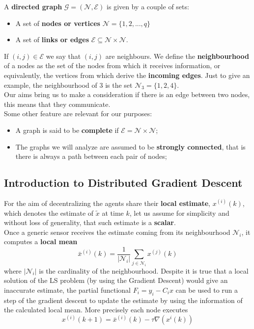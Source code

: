 \noindent
A \textbf{directed graph} $\mathcal{G}=(\mathcal{N}, \mathcal{E})$ is given by a couple of sets:
\begin{itemize}
    \item A set of \textbf{nodes or vertices} $\mathcal{N}=\{1,2,..., q\}$
    \item A set of \textbf{links or edges} $\mathcal{E}\subseteq\mathcal{N} \times  \mathcal{N}.$
\end{itemize}
If $(i,j)\in\mathcal{E}$ we say that $(i,j)$ are neighbours. We define the \textbf{neighbourhood} of a nodes as the set of the nodes from which it receives information, or equivalently, the vertices from which derive the \textbf{incoming edges}. Just to give an example, the neighbourhood of 3 is the set $\mathcal{N}_3=\{1,2,4\}$. \\
Our aims bring us to make a consideration if there is an edge between two nodes, this means that they communicate.\\
Some other feature are relevant for our purposes: 
\begin{itemize}
    \item A graph is said to be \textbf{complete} if $\mathcal{E}=\mathcal{N} \times \mathcal{N}$; 
    \item The graphs we will analyze are assumed to be \textbf{strongly connected}, that is there is always a path between each pair of nodes; 
\end{itemize}

\subsection{Introduction to Distributed Gradient Descent}
For the aim of decentralizing the agents share their \textbf{local estimate}, $x^{(i)}(k)$, which denotes the {\color{red} estimate of $\tilde{x}$ at time $k$}, let us assume for simplicity and without loss of generality, that such estimate is a \textbf{scalar}. \\
Once a generic sensor receives the estimate coming from its neighbourhood $\mathcal{N}_i$, it computes a \textbf{local mean}
\begin{equation}
    \bar{x}^{(i)}(k) = \frac{1}{\vert \mathcal{N}_i \vert} \sum_{j\in\mathcal{N}_i} x^{(j)}(k)
\end{equation}
where $\vert \mathcal{N}_i \vert$ is the cardinality of the neighbourhood. Despite it is true that a local solution of the LS problem (by using the Gradient Descent) would give an inaccurate estimate, the partial functional $F_i=y_i-C_ix$ can be used to run a step of the gradient descent to update the estimate by using the information of the calculated local mean. More precisely each node executes
\begin{equation}    \label{eq:DGD_1}
    x^{(i)}(k+1) = \bar{x}^{(i)}(k) -\tau \nabla (x^{i}(k))
\end{equation}

